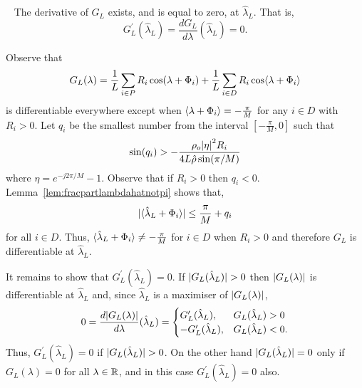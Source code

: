 \documentclass[journal]{IEEEtran}
\begin{document}
\begin{lemma}~\label{lem:diffatlambdaL}
The derivative of $G_L$ exists, and is equal to zero, at $\hat{\lambda}_L$.  That is,
\[
G_L^\prime(\hat{\lambda}_L) = \frac{d G_L}{d \lambda}(\hat{\lambda}_L) = 0.
\]
\end{lemma}
\begin{IEEEproof}
Observe that 
\[
G_L(\lambda) = \frac{1}{L}\sum_{i \in P} R_i \cos(\lambda + \Phi_i) + \frac{1}{L} \sum_{i \in D} R_i \cos\langle \lambda + \Phi_i \rangle
\] 
is differentiable everywhere except when $\left\langle \lambda + \Phi_i \right\rangle = -\tfrac{\pi}{M}$ for any $i \in D$ with $R_i > 0$.  Let $q_i$ be the smallest number from the interval $[-\tfrac{\pi}{M}, 0]$ such that
\[
 \sin(q_i) > -\frac{\rho_o {\vert \eta \vert}^2 R_i}{4 L \hat{\rho} \sin(\pi/M)}
\]
where $\eta = e^{-j2\pi/M} - 1$.  Observe that if $R_i > 0$ then $q_i < 0$.  Lemma~\ref{lem:fracpartlambdahatnotpi} shows that,
\[
{\vert \langle \hat{\lambda}_L + \Phi_i \rangle \vert} \leq \frac{\pi}{M} + q_i
\]
for all $i \in D$.  Thus, $\langle \hat{\lambda}_L + \Phi_i \rangle \neq -\tfrac{\pi}{M}$ for $i \in D$ when $R_i > 0$ and therefore $G_L$ is differentiable at $\hat{\lambda}_L$.  

It remains to show that $G_L^\prime(\hat{\lambda}_L) = 0$.  If ${\vert G_L(\hat{\lambda}_L) \vert} > 0$ then ${\vert G_L(\lambda) \vert}$ is differentiable at $\hat{\lambda}_L$ and, since $\hat{\lambda}_L$ is a maximiser of ${\vert G_L(\lambda) \vert}$,
\[
0 = \frac{d {\vert G_L(\lambda) \vert}}{d \lambda}(\hat{\lambda}_L) = \begin{cases} 
G_L^\prime(\hat{\lambda}_L), & G_L(\hat{\lambda}_L) > 0\\
-G_L^\prime(\hat{\lambda}_L), & G_L(\hat{\lambda}_L) < 0.
\end{cases}
\]
Thus, $G_L^\prime(\hat{\lambda}_L) = 0$ if ${\vert G_L(\hat{\lambda}_L) \vert} > 0$.  On the other hand ${\vert G_L(\hat{\lambda}_L) \vert} = 0$ only if $G_L(\lambda) = 0$ for all $\lambda \in {\mathbb R}$, and in this case $G_L^\prime(\hat{\lambda}_L) = 0$ also. 
\end{IEEEproof}
\end{document}
